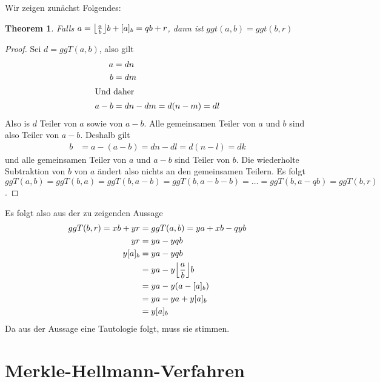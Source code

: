 \documentclass{../crypto}
\newtheorem{theorem}{Theorem}
\begin{document}
Wir zeigen zunächst Folgendes:

\begin{theorem}
Falls $a = \floor*{\frac{a}{b}}b + [a]_b = qb + r$, dann
   ist $ggt(a,b) = ggt(b,r)$
\end{theorem}
\begin{proof}
   Sei $d=ggT(a,b)$, also gilt
   \begin{align*}
      a & = dn \\
      b & = dm \\
      \intertext{Und daher}
      a - b & = dn - dm  = d(n-m) = dl
   \end{align*}
   Also is $d$ Teiler von $a$ sowie von $a-b$. Alle gemeinsamen Teiler von $a$
   und $b$ sind also Teiler von $a-b$. Deshalb gilt
   \begin{align*}
      b & = a - (a - b) = dn - dl = d(n - l) = dk
   \end{align*}
   und alle gemeinsamen Teiler von $a$ und $a-b$ sind Teiler von $b$. Die
   wiederholte Subtraktion von $b$ von $a$ ändert also nichts an den gemeinsamen
   Teilern. Es folgt $ggT(a,b) = ggT(b,a) = ggT(b, a - b) = ggT(b, a - b - b) =
   \ldots = ggT(b, a - qb) = ggT(b,r)$.
\end{proof}

Es folgt also aus der zu zeigenden Aussage
\begin{align*}
   ggT(b,r) = xb + yr & = ggT(a,b) = ya + xb - qyb \\
            yr & = ya - yqb \\
            y [a]_b & = ya - yqb \\
                    & = ya -y \floor*{\frac{a}{b}} b \\
                    & = ya - y(a - [a]_b) \\
                    & = ya - ya + y [a]_b \\
                    & = y [a]_b
\end{align*}
Da aus der Aussage eine Tautologie folgt, muss sie stimmen.

\subsection{}


\section{Merkle-Hellmann-Verfahren}

\subsection{}
\end{document}
